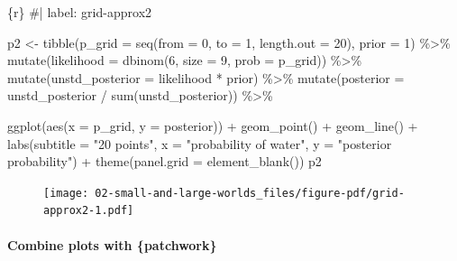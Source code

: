 \documentclass[
  letterpaper,
  DIV=11,
  numbers=noendperiod]{scrreprt}
\let\oldparagraph\paragraph
\renewcommand{\paragraph}[1]{\oldparagraph{#1}\mbox{}}
\newenvironment{Shaded}{\begin{snugshade}}{\end{snugshade}}
\newcommand{\AttributeTok}[1]{\textcolor[rgb]{0.40,0.45,0.13}{#1}}
\newcommand{\CommentTok}[1]{\textcolor[rgb]{0.37,0.37,0.37}{#1}}
\newcommand{\DecValTok}[1]{\textcolor[rgb]{0.68,0.00,0.00}{#1}}
\newcommand{\FunctionTok}[1]{\textcolor[rgb]{0.28,0.35,0.67}{#1}}
\newcommand{\InformationTok}[1]{\textcolor[rgb]{0.37,0.37,0.37}{#1}}
\newcommand{\NormalTok}[1]{\textcolor[rgb]{0.00,0.23,0.31}{#1}}
\newcommand{\OtherTok}[1]{\textcolor[rgb]{0.00,0.23,0.31}{#1}}
\newcommand{\SpecialCharTok}[1]{\textcolor[rgb]{0.37,0.37,0.37}{#1}}
\newcommand{\StringTok}[1]{\textcolor[rgb]{0.13,0.47,0.30}{#1}}
\begin{document}
\begin{Shaded}
\begin{Highlighting}[]
\InformationTok{\textasciigrave{}\textasciigrave{}\textasciigrave{}\{r\}}
\CommentTok{\#| label: grid{-}approx2}

\NormalTok{p2 }\OtherTok{\textless{}{-}}
  \FunctionTok{tibble}\NormalTok{(}\AttributeTok{p\_grid =} \FunctionTok{seq}\NormalTok{(}\AttributeTok{from =} \DecValTok{0}\NormalTok{, }\AttributeTok{to =} \DecValTok{1}\NormalTok{, }\AttributeTok{length.out =} \DecValTok{20}\NormalTok{),}
         \AttributeTok{prior  =} \DecValTok{1}\NormalTok{) }\SpecialCharTok{\%\textgreater{}\%}
  \FunctionTok{mutate}\NormalTok{(}\AttributeTok{likelihood =} \FunctionTok{dbinom}\NormalTok{(}\DecValTok{6}\NormalTok{, }\AttributeTok{size =} \DecValTok{9}\NormalTok{, }\AttributeTok{prob =}\NormalTok{ p\_grid)) }\SpecialCharTok{\%\textgreater{}\%}
  \FunctionTok{mutate}\NormalTok{(}\AttributeTok{unstd\_posterior =}\NormalTok{ likelihood }\SpecialCharTok{*}\NormalTok{ prior) }\SpecialCharTok{\%\textgreater{}\%}
  \FunctionTok{mutate}\NormalTok{(}\AttributeTok{posterior =}\NormalTok{ unstd\_posterior }\SpecialCharTok{/} \FunctionTok{sum}\NormalTok{(unstd\_posterior)) }\SpecialCharTok{\%\textgreater{}\%} 
  
  \FunctionTok{ggplot}\NormalTok{(}\FunctionTok{aes}\NormalTok{(}\AttributeTok{x =}\NormalTok{ p\_grid, }\AttributeTok{y =}\NormalTok{ posterior)) }\SpecialCharTok{+}
  \FunctionTok{geom\_point}\NormalTok{() }\SpecialCharTok{+}
  \FunctionTok{geom\_line}\NormalTok{() }\SpecialCharTok{+}
  \FunctionTok{labs}\NormalTok{(}\AttributeTok{subtitle =} \StringTok{"20 points"}\NormalTok{,}
       \AttributeTok{x =} \StringTok{"probability of water"}\NormalTok{,}
       \AttributeTok{y =} \StringTok{"posterior probability"}\NormalTok{) }\SpecialCharTok{+}
  \FunctionTok{theme}\NormalTok{(}\AttributeTok{panel.grid =} \FunctionTok{element\_blank}\NormalTok{())}
\NormalTok{p2}
\InformationTok{\textasciigrave{}\textasciigrave{}\textasciigrave{}}
\end{Highlighting}
\end{Shaded}

\begin{figure}[H]

{\centering \texttt{[image: 02-small-and-large-worlds\_files/figure-pdf/grid-approx2-1.pdf]}

}

\end{figure}

\hypertarget{combine-plots-with-patchwork}{%
\paragraph{Combine plots with
\{patchwork\}}\label{combine-plots-with-patchwork}}
\end{document}

